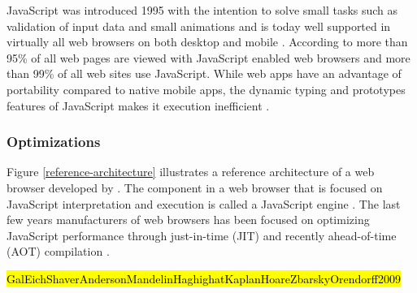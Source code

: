 JavaScript was introduced 1995 with the intention to solve small tasks such as validation of input data and small animations \parencite{Moller2018} and is today well supported in virtually all web browsers on both desktop and mobile \parencite{Zakai2011}. According to \textcite{TiwariSolihin2012} more than 95\% of all web pages are viewed with JavaScript enabled web browsers and more than 99\% of all web sites use JavaScript. While web apps have an advantage of portability compared to native mobile apps, the dynamic typing and prototypes features of JavaScript makes it execution inefficient \parencite{ParkJungMoon2015}.

\subsubsection*{Optimizations}

Figure \ref{reference-architecture} illustrates a reference architecture of a web browser developed by \textcite{GrosskurthGodfrey2005}. The component in a web browser that is focused on JavaScript interpretation and execution is called a JavaScript engine \parencite{JeonChoi2012}. The last few years manufacturers of web browsers has been focused on optimizing JavaScript performance through just-in-time (JIT) and recently ahead-of-time (AOT) compilation \parencite{HerreraChenLavoieHendren2018}.

\begin{comment}

\begin{figure}[!h]
\centering
\texttt{[image: ../Figures/reference-architecture]}
\caption{Web browser reference architecture. Adapted from \textcite{GrosskurthGodfrey2005}.}
\label{reference-architecture}
\end{figure}
    
\begin{figure}[!h]
\centering
\texttt{[image: ../Figures/javascript-optimization]}
\caption{JavaScript execution tiers. Adapted from \textcite{ParkKimMoon2017,ZhuykovVardanyanMelnikBuchatskiySharygin2015}.}
\label{javascript-optimization}
\end{figure}
    
\end{comment}

\hl{GalEichShaverAndersonMandelinHaghighatKaplanHoareZbarskyOrendorff2009}


